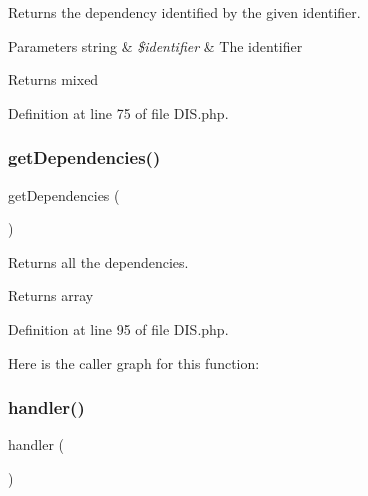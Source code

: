 Returns the dependency identified by the given identifier.


\begin{DoxyParams}[1]{Parameters}
string & {\em \$identifier} & The identifier\\
\hline
\end{DoxyParams}
\begin{DoxyReturn}{Returns}
mixed 
\end{DoxyReturn}


Definition at line 75 of file D\+I\+S.\+php.

\mbox{\label{class_zest_1_1_common_1_1_container_1_1_d_i_s_a4f0d16046ea95ab73fa42d2aec2d1057}} 
\subsubsection{\texorpdfstring{get\+Dependencies()}{getDependencies()}}
{\footnotesize\ttfamily get\+Dependencies (\begin{DoxyParamCaption}{ }\end{DoxyParamCaption})}

Returns all the dependencies.

\begin{DoxyReturn}{Returns}
array 
\end{DoxyReturn}


Definition at line 95 of file D\+I\+S.\+php.

Here is the caller graph for this function\+:
\mbox{\label{class_zest_1_1_common_1_1_container_1_1_d_i_s_a501269111e2ae6a7d2af12117a6e84c0}} 
\subsubsection{\texorpdfstring{handler()}{handler()}}
{\footnotesize\ttfamily handler (\begin{DoxyParamCaption}{ }\end{DoxyParamCaption})}

